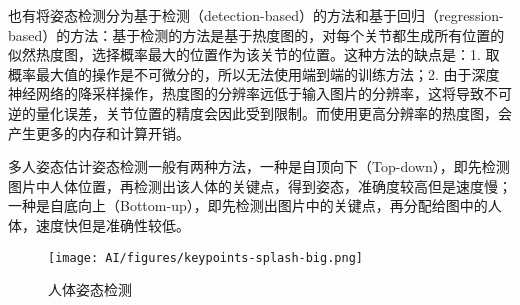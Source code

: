 也有将姿态检测分为基于检测（detection-based）的方法和基于回归（regression-based）的方法：基于检测的方法是基于热度图的，对每个关节都生成所有位置的似然热度图，选择概率最大的位置作为该关节的位置。这种方法的缺点是：1. 取概率最大值的操作是不可微分的，所以无法使用端到端的训练方法；2. 由于深度神经网络的降采样操作，热度图的分辨率远低于输入图片的分辨率，这将导致不可逆的量化误差，关节位置的精度会因此受到限制。而使用更高分辨率的热度图，会产生更多的内存和计算开销。

多人姿态估计姿态检测一般有两种方法，一种是自顶向下（Top-down），即先检测图片中人体位置，再检测出该人体的关键点，得到姿态，准确度较高但是速度慢；一种是自底向上（Bottom-up），即先检测出图片中的关键点，再分配给图中的人体，速度快但是准确性较低。



\begin{figure}
    \centering
    \texttt{[image: AI/figures/keypoints-splash-big.png]}
    \caption{人体姿态检测}
    \label{fig:keypoint}
\end{figure}

